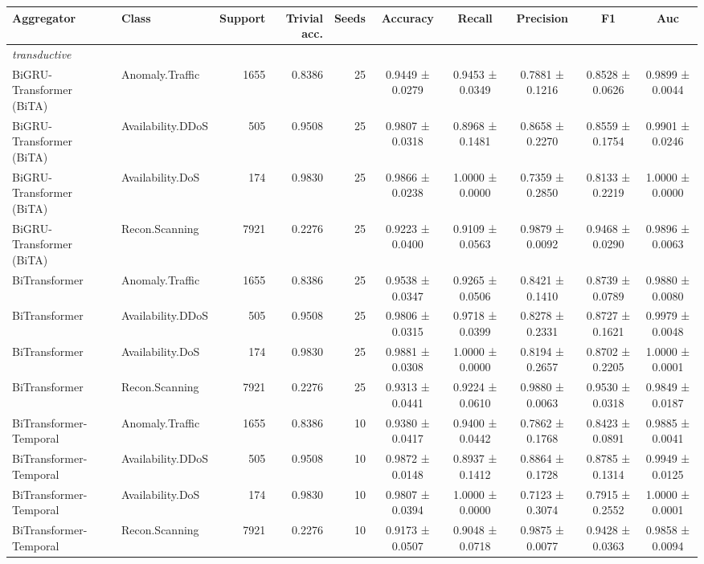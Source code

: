 \begin{tabular}{llrrrccccc}
\toprule
Aggregator & Class & Support & Trivial acc. & Seeds & Accuracy & Recall & Precision & F1 & Auc \\
\midrule
\multicolumn{10}{l}{\textit{transductive}} \\
\midrule
BiGRU-Transformer (BiTA) & Anomaly.Traffic & 1655 & 0.8386 & 25 & 0.9449 ± 0.0279 & 0.9453 ± 0.0349 & 0.7881 ± 0.1216 & 0.8528 ± 0.0626 & 0.9899 ± 0.0044 \\
BiGRU-Transformer (BiTA) & Availability.DDoS & 505 & 0.9508 & 25 & 0.9807 ± 0.0318 & 0.8968 ± 0.1481 & 0.8658 ± 0.2270 & 0.8559 ± 0.1754 & 0.9901 ± 0.0246 \\
BiGRU-Transformer (BiTA) & Availability.DoS & 174 & 0.9830 & 25 & 0.9866 ± 0.0238 & 1.0000 ± 0.0000 & 0.7359 ± 0.2850 & 0.8133 ± 0.2219 & 1.0000 ± 0.0000 \\
BiGRU-Transformer (BiTA) & Recon.Scanning & 7921 & 0.2276 & 25 & 0.9223 ± 0.0400 & 0.9109 ± 0.0563 & 0.9879 ± 0.0092 & 0.9468 ± 0.0290 & 0.9896 ± 0.0063 \\
BiTransformer & Anomaly.Traffic & 1655 & 0.8386 & 25 & 0.9538 ± 0.0347 & 0.9265 ± 0.0506 & 0.8421 ± 0.1410 & 0.8739 ± 0.0789 & 0.9880 ± 0.0080 \\
BiTransformer & Availability.DDoS & 505 & 0.9508 & 25 & 0.9806 ± 0.0315 & 0.9718 ± 0.0399 & 0.8278 ± 0.2331 & 0.8727 ± 0.1621 & 0.9979 ± 0.0048 \\
BiTransformer & Availability.DoS & 174 & 0.9830 & 25 & 0.9881 ± 0.0308 & 1.0000 ± 0.0000 & 0.8194 ± 0.2657 & 0.8702 ± 0.2205 & 1.0000 ± 0.0001 \\
BiTransformer & Recon.Scanning & 7921 & 0.2276 & 25 & 0.9313 ± 0.0441 & 0.9224 ± 0.0610 & 0.9880 ± 0.0063 & 0.9530 ± 0.0318 & 0.9849 ± 0.0187 \\
BiTransformer-Temporal & Anomaly.Traffic & 1655 & 0.8386 & 10 & 0.9380 ± 0.0417 & 0.9400 ± 0.0442 & 0.7862 ± 0.1768 & 0.8423 ± 0.0891 & 0.9885 ± 0.0041 \\
BiTransformer-Temporal & Availability.DDoS & 505 & 0.9508 & 10 & 0.9872 ± 0.0148 & 0.8937 ± 0.1412 & 0.8864 ± 0.1728 & 0.8785 ± 0.1314 & 0.9949 ± 0.0125 \\
BiTransformer-Temporal & Availability.DoS & 174 & 0.9830 & 10 & 0.9807 ± 0.0394 & 1.0000 ± 0.0000 & 0.7123 ± 0.3074 & 0.7915 ± 0.2552 & 1.0000 ± 0.0001 \\
BiTransformer-Temporal & Recon.Scanning & 7921 & 0.2276 & 10 & 0.9173 ± 0.0507 & 0.9048 ± 0.0718 & 0.9875 ± 0.0077 & 0.9428 ± 0.0363 & 0.9858 ± 0.0094 \\

\end{tabular}
